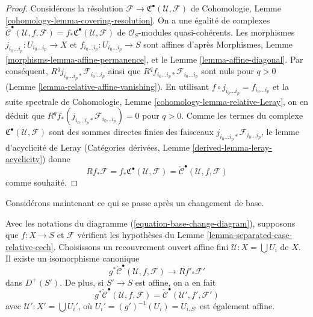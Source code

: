 \begin{proof}
Considérons la résolution
$\mathcal{F} \to {\mathfrak C}^\bullet(\mathcal{U}, \mathcal{F})$
de Cohomologie, Lemme \ref{cohomology-lemma-covering-resolution}. On a une
égalité de complexes
$\check{\mathcal{C}}^\bullet(\mathcal{U}, f, \mathcal{F}) =
f_*{\mathfrak C}^\bullet(\mathcal{U}, \mathcal{F})$
de $\mathcal{O}_S$-modules quasi-cohérents. Les morphismes
$j_{i_0 \ldots i_p} : U_{i_0 \ldots i_p} \to X$ et
$f_{i_0 \ldots i_p} : U_{i_0 \ldots i_p} \to S$ sont affines d'après
Morphismes, Lemme \ref{morphisms-lemma-affine-permanence}, et le Lemme
\ref{lemma-affine-diagonal}. Par conséquent,
$R^qj_{i_0 \ldots i_p *}\mathcal{F}_{i_0 \ldots i_p}$ ainsi que
$R^qf_{i_0 \ldots i_p *}\mathcal{F}_{i_0 \ldots i_p}$ sont nuls pour $q > 0$
(Lemme \ref{lemma-relative-affine-vanishing}). En utilisant
$f \circ j_{i_0 \ldots i_p} = f_{i_0 \ldots i_p}$ et la suite spectrale de
Cohomologie, Lemme \ref{cohomology-lemma-relative-Leray}, on en déduit que
$R^qf_*(j_{i_0 \ldots i_p *}\mathcal{F}_{i_0 \ldots i_p}) = 0$
pour $q > 0$. Comme les termes du complexe
${\mathfrak C}^\bullet(\mathcal{U}, \mathcal{F})$ sont des sommes directes
finies des faisceaux
$j_{i_0 \ldots i_p *}\mathcal{F}_{i_0 \ldots i_p}$, le lemme d'acyclicité de
Leray (Catégories dérivées, Lemme \ref{derived-lemma-leray-acyclicity}) donne
$$
Rf_* \mathcal{F} = f_*{\mathfrak C}^\bullet(\mathcal{U}, \mathcal{F}) =
\check{\mathcal{C}}^\bullet(\mathcal{U}, f, \mathcal{F})
$$
comme souhaité.
\end{proof}

\noindent
Considérons maintenant ce qui se passe après un changement de base.

\begin{lemma}
\label{lemma-base-change-complex}
Avec les notations du diagramme (\ref{equation-base-change-diagram}),
supposons que $f : X \to S$ et $\mathcal{F}$ vérifient les hypothèses du
Lemme \ref{lemma-separated-case-relative-cech}. Choisissons un recouvrement
ouvert affine fini $\mathcal{U} : X = \bigcup U_i$ de $X$. Il existe un
isomorphisme canonique
$$
g^*\check{\mathcal{C}}^\bullet(\mathcal{U}, f, \mathcal{F})
\longrightarrow
Rf'_*\mathcal{F}'
$$
dans $D^{+}(S')$. De plus, si $S' \to S$ est affine, on a en fait
$$
g^*\check{\mathcal{C}}^\bullet(\mathcal{U}, f, \mathcal{F})
=
\check{\mathcal{C}}^\bullet(\mathcal{U}', f', \mathcal{F}')
$$
avec $\mathcal{U}' : X' = \bigcup U_i'$, où
$U_i' = (g')^{-1}(U_i) = U_{i, S'}$ est également affine.
\end{lemma}

